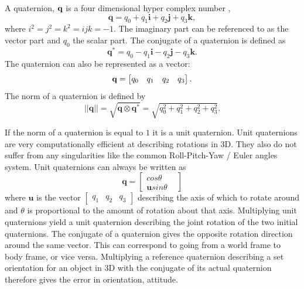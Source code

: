\documentclass{article}
\begin{document}
A quaternion, $\bold{q}$ is a four dimensional hyper complex number \cite{P2},
\begin{equation}
 \mathbf{q} = q_0 + q_1 \mathbf{i} + q_2 \mathbf{j} + q_3 \mathbf{k},
\end{equation}
where $i^2 = j^2 = k^2 = ijk = -1$.\cite{Sola2016}
The imaginary part can be referenced to as the vector part and $q_0$ the scalar part.
The conjugate of a quaternion is defined as
\begin{equation}
     \mathbf{q^*} = q_0 - q_1 \mathbf{i} - q_2 \mathbf{j} - q_3 \mathbf{k}.
\end{equation}
The quaternion can also be represented as a vector:
\begin{equation}
     \bold{q} = \left[
     \begin{matrix}
     q_0 &q_1 &q_2 &q_3
     \end{matrix}\right].
\end{equation}
The norm of a quaternion is defined by
\begin{equation}
    ||\mathbf{q}|| = \sqrt{\mathbf{q} \otimes \mathbf{q}^*} = \sqrt{q_0^2 + q_1^2 + q_2^2 + q_3^2}.
\end{equation}

If the norm of a quaternion is equal to $1$ it is a unit quaternion.
Unit quaternions are very computationally efficient at describing rotations in 3D.
They also do not suffer from any singularities like the common Roll-Pitch-Yaw / Euler angles system.
Unit quaternions can always be written as
\begin{equation}
    \mathbf{q} = \left[\begin{matrix} cos \theta &\\ \mathbf{u} sin \theta\end{matrix}\right]
\end{equation}
where $\mathbf{u}$ is the vector $\left[\begin{matrix} q_1 & q_2 & q_3 \end{matrix}\right]$
describing the axis of which to rotate around and $\theta$ is proportional to the amount of rotation about that axis.
Multiplying unit quaternions yield a unit quaternion describing the joint rotation of the two initial quaternions.
The conjugate of a quaternion gives the opposite rotation direction around the same vector.
This can correspond to going from a world frame to body frame, or vice versa.
Multiplying a reference quaternion describing a set orientation for an object in 3D with the conjugate of its actual quaternion therefore gives the error in orientation, attitude.
\end{document}
